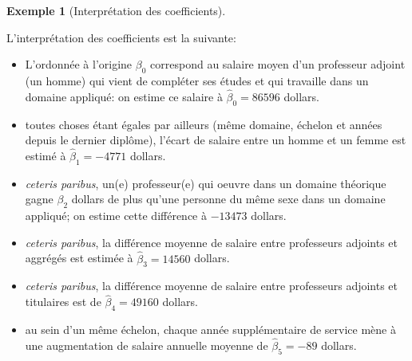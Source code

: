 \documentclass[
  11pt,
  letterpaper,
]{scrbook}
\providecommand{\tightlist}{%
  \setlength{\itemsep}{0pt}\setlength{\parskip}{0pt}}\usepackage{longtable,booktabs,array}
\theoremstyle{plain}
\theoremstyle{plain}
\theoremstyle{definition}
\newtheorem{example}{Exemple}[chapter]
\theoremstyle{definition}
\theoremstyle{remark}
\begin{document}
\begin{example}[Interprétation des
coefficients]
\begin{longtable}[]
\end{longtable}

L'interprétation des coefficients est la suivante:

\begin{itemize}
\tightlist
\item
  L'ordonnée à l'origine \(\beta_0\) correspond au salaire moyen d'un
  professeur adjoint (un homme) qui vient de compléter ses études et qui
  travaille dans un domaine appliqué: on estime ce salaire à
  \(\widehat{\beta}_0=86596\) dollars.
\item
  toutes choses étant égales par ailleurs (même domaine, échelon et
  années depuis le dernier diplôme), l'écart de salaire entre un homme
  et un femme est estimé à \(\widehat{\beta}_1=-4771\) dollars.
\item
  \emph{ceteris paribus}, un(e) professeur(e) qui oeuvre dans un domaine
  théorique gagne \(\beta_2\) dollars de plus qu'une personne du même
  sexe dans un domaine appliqué; on estime cette différence à \(-13473\)
  dollars.
\item
  \emph{ceteris paribus}, la différence moyenne de salaire entre
  professeurs adjoints et aggrégés est estimée à
  \(\widehat{\beta}_3=14560\) dollars.
\item
  \emph{ceteris paribus}, la différence moyenne de salaire entre
  professeurs adjoints et titulaires est de \(\widehat{\beta}_4=49160\)
  dollars.
\item
  au sein d'un même échelon, chaque année supplémentaire de service mène
  à une augmentation de salaire annuelle moyenne de
  \(\widehat{\beta}_5=-89\) dollars.
\end{itemize}

\end{example}
\end{document}
